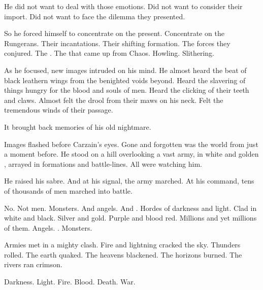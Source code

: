 He did not want to deal with those emotions. 
Did not want to consider their import. 
Did not want to face the dilemma they presented. 

So he forced himself to concentrate on the present. 
Concentrate on the Rungerans. 
Their incantations. 
Their shifting formation. 
The forces they conjured. 
The \daemons. 
The \daemons{} that came up from Chaos. 
Howling. 
Slithering. 

As he focused, new images intruded on his mind. 
He almost heard the beat of black leathern wings from the benighted voids beyond. 
Heard the slavering of things hungry for the blood and souls of men. 
Heard the clicking of their teeth and claws. 
Almost felt the drool from their maws on his neck. 
Felt the tremendous winds of their passage. 

It brought back memories of his old nightmare. 




Images flashed before Carzain's eyes. 
Gone and forgotten was the world from just a moment before. 
He stood on a hill overlooking a vast army, \armoured in white and golden \colours, arrayed in formations and battle-lines. 
All were watching him. 

He raised his sabre. 
And at his signal, the army marched. 
At his command, tens of thousands of men marched into battle. 

No. 
Not men. 
Monsters. 
And angels. 
And \daemons. 
Hordes of darkness and light.  
Clad in white and black. 
Silver and gold. 
Purple and blood red. 
Millions and yet millions of them. 
Angels. 
\Dragons. 
Monsters. 

Armies met in a mighty clash. 
Fire and lightning cracked the sky. 
Thunders rolled. 
The earth quaked. 
The heavens blackened. 
The horizons burned. 
The rivers ran crimson. 

Darkness. 
Light. 
Fire. 
Blood. 
Death. 
War. 


